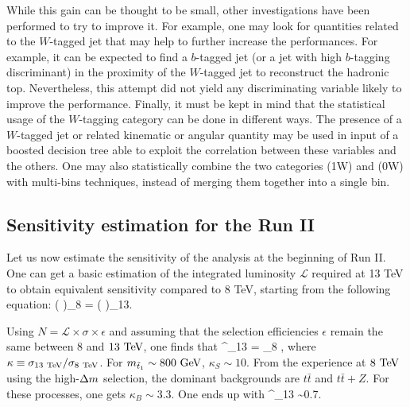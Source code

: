     While this gain can be thought to be small, other investigations have been
    performed to try to improve it.
    For example, one may look for quantities related to the $W$-tagged jet that may help to further
    increase the performances. For example, it can be expected to find a $b$-tagged
    jet (or a jet with high $b$-tagging discriminant) in the proximity of the $W$-tagged
    jet to reconstruct the hadronic top. Nevertheless, this attempt did not yield
    any discriminating variable likely to improve the performance.
    Finally, it must be kept in mind that the statistical usage of the $W$-tagging
    category can be done in different ways. The presence of a $W$-tagged jet or
    related kinematic or angular quantity may be used in input of a boosted decision
    tree able to exploit the correlation between these variables and the others.
    One may also statistically combine the two categories (1W) and (0W) with multi-bins
    techniques, instead of merging them together into a single bin.

    \subsection{Sensitivity estimation for the Run II}

    Let us now estimate the sensitivity of the analysis at the beginning of Run II.
    One can get a basic estimation of the integrated luminosity $\mathcal{L}$ required
    at 13 TeV to obtain equivalent sensitivity compared to 8 TeV, starting from the
    following equation:
    {
        \left(
        \right)_{8\TeV}
        =
        \left(
        \right)_{13\TeV}.
    }

    Using $N = \mathcal{L} \times \sigma \times \epsilon$ and assuming that the selection
    efficiencies $\epsilon$ remain the same between $8$ and $13~\text{TeV}$, one finds that
    {
        ^_{13\TeV}
        =
        _{8\TeV}
        \times
        ,
    }
    where $\kappa \equiv \sigma_{13~\text{TeV}} / \sigma_{8~\text{TeV}}$. For $m_{\tilde{t}_1} \sim 800~\text{GeV}$,
    $\kappa_S \sim 10$. From the experience at $8~\text{TeV}$ using the high-$\Delta m$ selection,
    the dominant backgrounds are $t\bar{t}$ and $t\bar{t}+Z$. For these processes, one
    gets $\kappa_B \sim 3.3$. One ends up with
    {
        ^_{13\TeV} \sim 0.7\invfb.
    }

